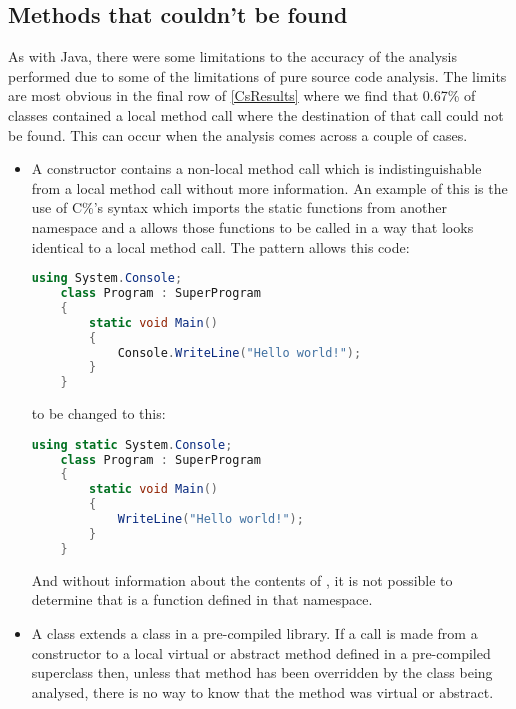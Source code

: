 \subsection{Methods that couldn't be found}
As with Java, there were some limitations to the accuracy of the analysis performed due to some of the limitations of pure source code analysis. The limits are most obvious in the final row of \ref{CsResults} where we find that 0.67\% of classes contained a local method call where the destination of that call could not be found. This can occur when the analysis comes across a couple of cases.
\begin{itemize}
	\item A constructor contains a non-local method call which is indistinguishable from a local method call without more information. An example of this is the use of C\%'s  syntax which imports the static functions from another namespace and a allows those functions to be called in a way that looks identical to a local method call. The  pattern allows this code:
	\begin{lstlisting}[language=cs]
	using System.Console;
	class Program : SuperProgram
	{ 
		static void Main() 
		{ 
			Console.WriteLine("Hello world!"); 
		} 
	}
	\end{lstlisting}
	to be changed to this:
	\begin{lstlisting}[language=cs]
	using static System.Console;
	class Program : SuperProgram
	{ 
		static void Main() 
		{ 
			WriteLine("Hello world!"); 
		} 
	}
	\end{lstlisting}
	And without information about the contents of , it is not possible to determine that  is a function defined in that namespace.
	\item A class extends a class in a pre-compiled library. If a call is made from a constructor to a local virtual or abstract method defined in a pre-compiled superclass then, unless that method has been overridden by the class being analysed, there is no way to know that the method was virtual or abstract.
\end{itemize}

